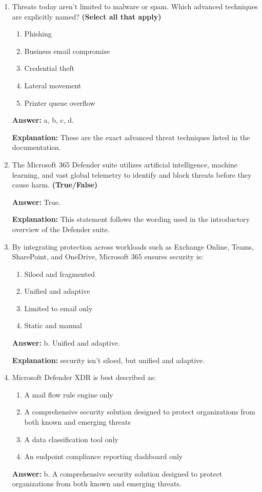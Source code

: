 \documentclass[10pt]{article}
\begin{document}
\begin{enumerate}[leftmargin=*]
\textbf{Explanation:} Microsoft 365 brings together tools across email, endpoints, identities, and applications.

\item Threats today aren’t limited to malware or spam. Which advanced techniques are explicitly named? \textbf{(Select all that apply)}
\begin{enumerate}[label=\alph*., leftmargin=1.5em]
\item Phishing
\item Business email compromise
\item Credential theft
\item Lateral movement
\item Printer queue overflow
\end{enumerate}
\textbf{Answer:} a, b, c, d.

\textbf{Explanation:} These are the exact advanced threat techniques listed in the documentation.

\item The Microsoft 365 Defender suite utilizes artificial intelligence, machine learning, and vast global telemetry to identify and block threats before they cause harm. \textbf{(True/False)}

\textbf{Answer:} True.

\textbf{Explanation:} This statement follows the wording used in the introductory overview of the Defender suite.

\item By integrating protection across workloads such as Exchange Online, Teams, SharePoint, and OneDrive, Microsoft 365 ensures security is:
\begin{enumerate}[label=\alph*., leftmargin=1.5em]
\item Siloed and fragmented
\item Unified and adaptive
\item Limited to email only
\item Static and manual
\end{enumerate}
\textbf{Answer:} b. Unified and adaptive.

\textbf{Explanation:} security isn't siloed, but unified and adaptive.

\item Microsoft Defender XDR is best described as:
\begin{enumerate}[label=\alph*., leftmargin=1.5em]
\item A mail flow rule engine only
\item A comprehensive security solution designed to protect organizations from both known and emerging threats
\item A data classification tool only
\item An endpoint compliance reporting dashboard only
\end{enumerate}
\textbf{Answer:} b. A comprehensive security solution designed to protect organizations from both known and emerging threats.


\end{enumerate}
\end{document}
